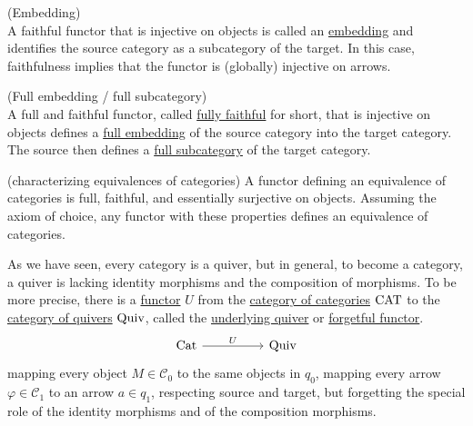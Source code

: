 \begin{definition}{(Embedding)}\label{def:embedding}\phantom{}\\
A faithful functor that is injective on objects is called an \ul{embedding} and identifies the source category
as a subcategory of the target. In this case, faithfulness implies that the functor is (globally) injective on arrows.
\end{definition}

\begin{definition}{(Full embedding / full subcategory)}\label{def:full_fully}\phantom{}\\
A full and faithful functor, called \ul{fully faithful} for short, that is injective on objects defines a \ul{full embedding} of the
source category into the target category. The source then defines a \ul{full subcategory} of the target category.
\end{definition}

\begin{theorem}{(characterizing equivalences of categories)}\label{thm:equiv_fully_faithful}
A functor defining an equivalence of categories is full, faithful, and essentially surjective on objects. Assuming the axiom of choice,
any functor with these properties defines an equivalence of categories.
\end{theorem}

\noindent As we have seen, every category is a quiver, but in general, to become a category, a quiver is lacking identity morphisms
and the composition of morphisms. To be more precise, there is a \ul{functor} $U$ from the \ul{category of categories} $\textup{CAT}$ to the
\ul{category of quivers} $\textup{Quiv}$, called the \ul{underlying quiver} or \ul{forgetful functor}.
\[
\begin{tikzcd}
\textup{Cat} \arrow[rr,"U"] &  & \textup{Quiv}
\end{tikzcd}
\]
mapping every object $M \in \mathcal{C}_{0}$ to the same objects in $q_{0}$, mapping every arrow $\varphi \in \mathcal{C}_{1}$ to 
an arrow $a \in q_{1}$, respecting source and target, but forgetting the special role of the identity morphisms and of the composition morphisms.

